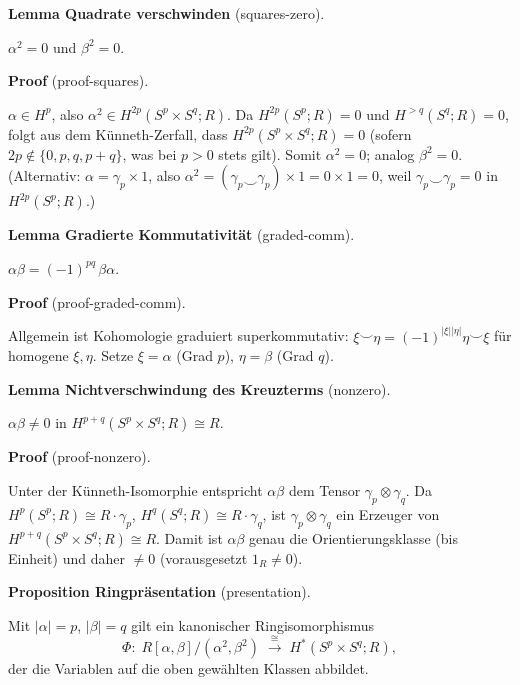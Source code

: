 \documentclass[10pt, letterpaper]{article}
\newcommand{\CustomHeading}[3]{%
  \par\medskip\noindent%
  \textbf{#1 #2} \textnormal{(#3)}.\enskip%
}
\newenvironment{PROP}[2]{\begin{unitbox}\CustomHeading{Proposition}{#1}{#2}}{\end{unitbox}}
\newenvironment{LEM}[2]{\begin{unitbox}\CustomHeading{Lemma}{#1}{#2}}{\end{unitbox}}
\newenvironment{PROOF}[2]{\begin{unitbox}\CustomHeading{Proof}{#1}{#2}}{\end{unitbox}}
\begin{document}
\begin{LEM}{Quadrate verschwinden}{squares-zero}
\(\alpha^2=0\) und \(\beta^2=0\).
\end{LEM}

\begin{PROOF}{}{proof-squares}
\(\alpha\in H^p\), also \(\alpha^2\in H^{2p}(S^p\times S^q;R)\).
Da \(H^{2p}(S^p;R)=0\) und \(H^{>q}(S^q;R)=0\), 
folgt aus dem Künneth-Zerfall, dass \(H^{2p}(S^p\times S^q;R)=0\) (sofern \(2p\notin\{0,p,q,p+q\}\), was bei \(p>0\) stets gilt).
Somit \(\alpha^2=0\); analog \(\beta^2=0\).
(Alternativ: \(\alpha=\gamma_p\times 1\), also \(\alpha^2=(\gamma_p\smile \gamma_p)\times 1=0\times 1=0\), 
weil \(\gamma_p\smile\gamma_p=0\) in \(H^{2p}(S^p;R)\).)
\end{PROOF}

\begin{LEM}{Gradierte Kommutativität}{graded-comm}
\(\alpha\beta = (-1)^{pq}\,\beta\alpha\).
\end{LEM}

\begin{PROOF}{}{proof-graded-comm}
Allgemein ist Kohomologie graduiert superkommutativ:
\(\xi\smile\eta=(-1)^{|\xi||\eta|}\eta\smile\xi\) für homogene \(\xi,\eta\).
Setze \(\xi=\alpha\) (Grad \(p\)), \(\eta=\beta\) (Grad \(q\)).
\end{PROOF}

\begin{LEM}{Nichtverschwindung des Kreuzterms}{nonzero}
\(\alpha\beta\neq 0\) in \(H^{p+q}(S^p\times S^q;R)\cong R\).
\end{LEM}

\begin{PROOF}{}{proof-nonzero}
Unter der Künneth-Isomorphie entspricht \(\alpha\beta\) dem Tensor \(\gamma_p\otimes\gamma_q\).
Da \(H^p(S^p;R)\cong R\cdot\gamma_p\), \(H^q(S^q;R)\cong R\cdot\gamma_q\),
ist \(\gamma_p\otimes\gamma_q\) ein Erzeuger von \(H^{p+q}(S^p\times S^q;R)\cong R\).
Damit ist \(\alpha\beta\) genau die Orientierungsklasse (bis Einheit) und daher \(\neq 0\) (vorausgesetzt \(1_R\neq 0\)).
\end{PROOF}

\begin{PROP}{Ringpräsentation}{presentation}
Mit \(|\alpha|=p\), \(|\beta|=q\) gilt ein kanonischer Ringisomorphismus
\[
\Phi:\; R[\alpha,\beta]/(\alpha^2,\beta^2)\;\xrightarrow{\ \cong\ }\; H^\ast(S^p\times S^q;R),
\]
der die Variablen auf die oben gewählten Klassen abbildet.
\end{PROP}
\end{document}
